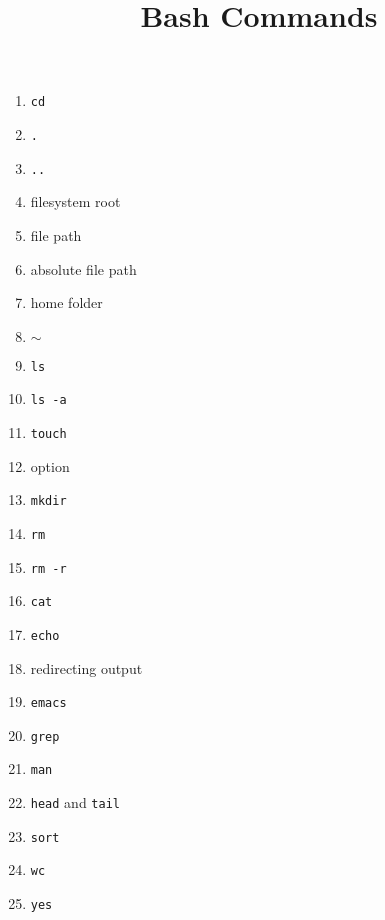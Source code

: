 \documentclass{article}
\title{Bash Commands}
\begin{document}
\maketitle
\begin{enumerate}
\item \texttt{cd}
\item \texttt{.}
\item \texttt{..}
\item filesystem root
\item file path
\item absolute file path
\item home folder
\item \texttt{$\sim$}
\item \texttt{ls}
\item \texttt{ls -a}
\item \texttt{touch}
\item option
\item \texttt{mkdir}
\item \texttt{rm}
\item \texttt{rm -r}
\item \texttt{cat}
\item \texttt{echo}
\item redirecting output
\item \texttt{emacs}
\item \texttt{grep}
\item \texttt{man}
\item \texttt{head} and \texttt{tail}
\item \texttt{sort}
\item \texttt{wc}
\item \texttt{yes}
\end{enumerate}
\end{document}
